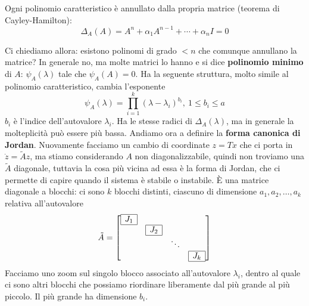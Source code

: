 \documentclass[10pt,a4paper]{book}
\begin{document}
\begin{ricalg}
Ogni polinomio caratteristico è annullato dalla propria matrice (teorema di Cayley-Hamilton):\begin{equation*}
\Delta _A\left( A\right) =A^{n} +\alpha _1 A^{n-1} +\cdots +\alpha _n I=0
\end{equation*}
\end{ricalg}
Ci chiediamo allora: esistono polinomi di grado $< n$ che comunque annullano la matrice? In generale no, ma molte matrici lo hanno e si dice \textbf{polinomio minimo} di $A$: $\psi _A\left( \lambda \right)$ tale che $\psi _A\left( A\right) =0$. Ha la seguente struttura, molto simile al polinomio caratteristico, cambia l'esponente
\begin{equation}
\psi _A\left( \lambda \right) =\prod ^{k}_{i=1}\left( \lambda -\lambda _i\right)^{b_i} ,\ 1\leqslant b_i \leqslant a
\end{equation}
$b_i$ è l'indice dell'autovalore $\lambda _i$. Ha le stesse radici di $\Delta _A\left( \lambda \right)$, ma in generale la molteplicità può essere più bassa. Andiamo ora a definire la \textbf{forma canonica di Jordan}. Nuovamente facciamo un cambio di coordinate $z=Tx$ che ci porta in $\dot{z} =\tilde{A} z$, ma stiamo considerando $A$ non diagonalizzabile, quindi non troviamo una $\tilde{A}$ diagonale, tuttavia la cosa più vicina ad essa è la forma di Jordan, che ci permette di capire quando il sistema è stabile o instabile. È una matrice diagonale a blocchi: ci sono $k$ blocchi distinti, ciascuno di dimensione $a_1 ,a_2 ,\dotsc ,a_k$ relativa all'autovalore
\begin{equation*}
\tilde{A} =\begin{bmatrix}
\begin{array}{|c|}
\hline
J_1\\
\hline
\end{array} &  &  & \\
 & \begin{array}{|c|}
\hline
J_2\\
\hline
\end{array} &  & \\
 &  & \ddots  & \\
 &  &  & \begin{array}{|c|}
\hline
J_k\\
\hline
\end{array}
\end{bmatrix}
\end{equation*}
Facciamo uno zoom sul singolo blocco associato all'autovalore $\lambda _i$, dentro al quale ci sono altri blocchi che possiamo riordinare liberamente dal più grande al più piccolo. Il più grande ha dimensione $b_i$.
\end{document}
